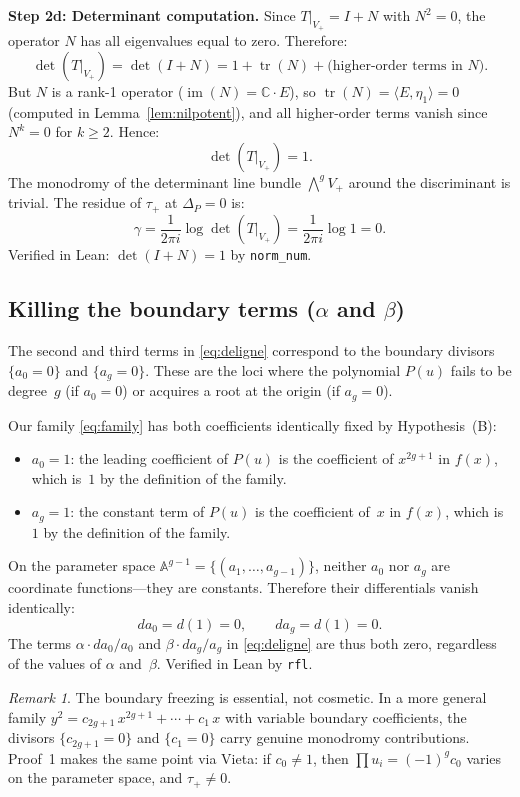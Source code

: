 \documentclass[11pt]{article}
\theoremstyle{plain}
\theoremstyle{definition}
\theoremstyle{remark}
\newtheorem{remark}[theorem]{Remark}
\newcommand{\CC}{\mathbb{C}}
\newcommand{\tr}{\operatorname{tr}}
\begin{document}
\textbf{Step 2d: Determinant computation.}
Since $T|_{V_+} = I + N$ with $N^2 = 0$, the operator $N$ has all eigenvalues
equal to zero.  Therefore:
\[
  \det(T|_{V_+}) = \det(I + N) = 1 + \tr(N) + \text{(higher-order terms in $N$)}.
\]
But $N$ is a rank-1 operator ($\operatorname{im}(N) = \CC\cdot E$), so $\tr(N) = \langle E, \eta_1\rangle = 0$
(computed in Lemma~\ref{lem:nilpotent}), and all higher-order terms vanish
since $N^k = 0$ for $k \geq 2$.  Hence:
\[
  \det(T|_{V_+}) = 1.
\]
The monodromy of the determinant line bundle $\bigwedge^g V_+$ around the
discriminant is trivial.  The residue of $\tau_+$ at $\Delta_P = 0$ is:
\[
  \gamma = \frac{1}{2\pi i}\log\det(T|_{V_+}) = \frac{1}{2\pi i}\log 1 = 0.
\]
Verified in Lean: $\det(I + N) = 1$ by \texttt{norm\_num}.

\subsection{Killing the boundary terms ($\alpha$ and $\beta$)}\label{subsec:kill-boundary}

The second and third terms in \eqref{eq:deligne} correspond to the
boundary divisors $\{a_0 = 0\}$ and $\{a_g = 0\}$.  These are the loci
where the polynomial $P(u)$ fails to be degree~$g$ (if $a_0 = 0$) or
acquires a root at the origin (if $a_g = 0$).

Our family \eqref{eq:family} has both coefficients identically fixed by
Hypothesis~(B):
\begin{itemize}
  \item $a_0 = 1$: the leading coefficient of $P(u)$ is the coefficient of
    $x^{2g+1}$ in $f(x)$, which is~$1$ by the definition of the family.
  \item $a_g = 1$: the constant term of $P(u)$ is the coefficient of~$x$ in
    $f(x)$, which is~$1$ by the definition of the family.
\end{itemize}
On the parameter space $\mathbb{A}^{g-1} = \{(a_1, \ldots, a_{g-1})\}$,
neither $a_0$ nor $a_g$ are coordinate functions---they are constants.
Therefore their differentials vanish identically:
\[
  da_0 = d(1) = 0, \qquad da_g = d(1) = 0.
\]
The terms $\alpha \cdot da_0/a_0$ and $\beta \cdot da_g/a_g$ in \eqref{eq:deligne}
are thus both zero, regardless of the values of $\alpha$ and~$\beta$.
Verified in Lean by \texttt{rfl}.

\begin{remark}\label{rmk:boundary-essential}
  The boundary freezing is essential, not cosmetic.  In a more general
  family $y^2 = c_{2g+1}\,x^{2g+1} + \cdots + c_1\,x$ with variable boundary
  coefficients, the divisors $\{c_{2g+1} = 0\}$ and $\{c_1 = 0\}$ carry
  genuine monodromy contributions.  Proof~1 makes the same point via Vieta:
  if $c_0 \neq 1$, then $\prod u_i = (-1)^g c_0$ varies on the parameter
  space, and $\tau_+ \neq 0$.
\end{remark}
\end{document}
